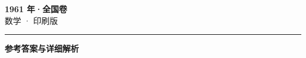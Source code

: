 \documentclass[zihao=5, a4paper]{ctexart}
\begin{document}
\begin{center}
  {\Large\bfseries 1961 年·全国卷}\\[4pt]
  {\large 数学 · 印刷版}
\end{center}
\medskip
{}

\par\bigskip\hrule\bigskip
{}
\begin{center}{\large\bfseries 参考答案与详细解析}\end{center}
\smallskip

\end{document}
